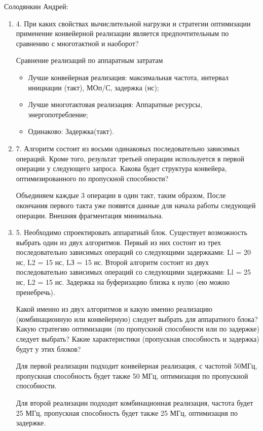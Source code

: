\documentclass[a4paper,14pt]{article}
\begin{document}
	Солодянкин Андрей:

	\begin{enumerate}
		\item 4. При каких свойствах вычислительной нагрузки и стратегии оптимизации применение	конвейерной реализации является предпочтительным по сравнению с многотактной и наоборот?
		
		Сравнение реализаций по аппаратным затратам
		\begin{itemize}
			\item Лучше конвейерная реализация: максимальная частота, интервал инициации (такт), МОп/С, задержка (нс);
			
			\item Лучше многотактовая реализация: Аппаратные ресурсы, энергопотребление;
			
			\item Одинаково: Задержка(такт).
		\end{itemize}
		
		\item 7. Алгоритм состоит из восьми одинаковых последовательно зависимых операций.	Кроме того, результат третьей операции используется в первой операции у следующего запроса. Какова будет структура конвейера, оптимизированного по пропускной способности?
		
		Объединяем каждые 3 операции в один такт, таким образом, После окончания первого такта уже появятся данные для начала работы следующей операции. Внешняя фрагментация минимальна.
	
		\item 5. Необходимо спроектировать аппаратный блок. Существует возможность выбрать один из двух алгоритмов. Первый из них состоит из трех последовательно зависимых операций со следующими задержками: Ll = 20 нс, L2 = 15 нс, LЗ = 15 нс. Второй	алгоритм состоит из двух последовательно зависимых операций со следующими задержками: Ll = 25 нс, L2 = 15 нс. Задержка на буферизацию близка к нулю (ею	можно пренебречь). 
		
		Какой именно из двух алгоритмов и какую именно реализацию (комбинационную или конвейерную) следует выбрать для аппаратного блока? 		
		Какую стратегию оптимизации (по пропускной способности или по задержке) следует выбрать? 		
		Какие характеристики (пропускная способность и задержка) будут у этих блоков?
		
		Для первой реализации подходит конвейерная реализация, с частотой 50МГц, пропускная способность будет также 50 МГц, оптимизация по пропускной способности.
		
		Для второй реализации подходит комбинационная реализация, частота будет 25 МГц, пропускная способность будет также 25 МГц, оптимизация по задержке.
		
		
		
	\end{enumerate}
	
\end{document}
